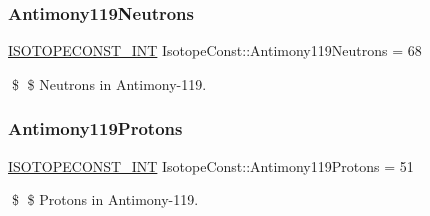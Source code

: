 \subsubsection{\texorpdfstring{Antimony119\+Neutrons}{Antimony119Neutrons}}
{\footnotesize\ttfamily \mbox{\hyperlink{group___isotope_const-_macros_ga5f18360b3e99483a35c32d789e62621c}{I\+S\+O\+T\+O\+P\+E\+C\+O\+N\+S\+T\+\_\+\+I\+NT}} Isotope\+Const\+::\+Antimony119\+Neutrons = 68}

\$ \$ Neutrons in Antimony-\/119. \mbox{\label{group___isotope_const-_antimony-_sb119_gabb78c3afba249e66dd8cb4b48c40213c}} 
\subsubsection{\texorpdfstring{Antimony119\+Protons}{Antimony119Protons}}
{\footnotesize\ttfamily \mbox{\hyperlink{group___isotope_const-_macros_ga5f18360b3e99483a35c32d789e62621c}{I\+S\+O\+T\+O\+P\+E\+C\+O\+N\+S\+T\+\_\+\+I\+NT}} Isotope\+Const\+::\+Antimony119\+Protons = 51}

\$ \$ Protons in Antimony-\/119. 